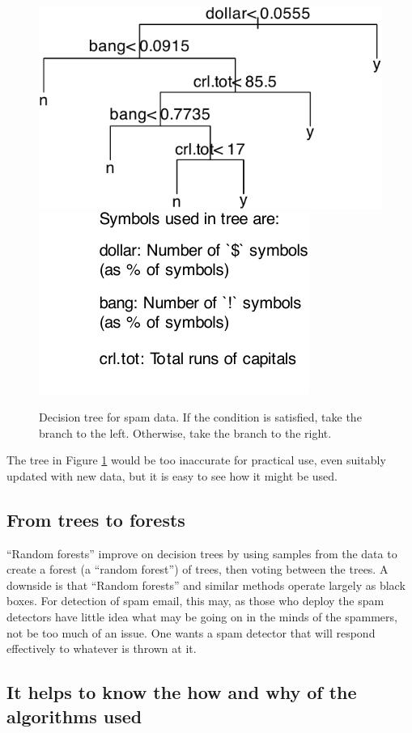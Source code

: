 \documentclass[
  10pt,
  b5paper]{book}
\begin{document}
\begin{figure}[H]

{\centering \includegraphics[width=0.48\linewidth]{08-observational_files/figure-latex/spam-1} \includegraphics[width=0.48\linewidth]{08-observational_files/figure-latex/spam-2} 

}

\caption{Decision tree for spam data. If the condition is satisfied, take
               the branch to the left.  Otherwise, take the branch to the right.}\label{fig:spam}
\end{figure}

The tree in Figure \ref{fig:spam} would be too inaccurate
for practical use, even suitably updated with new data,
but it is easy to see how it might be used.

\hypertarget{from-trees-to-forests}{%
\subsection*{From trees to forests}\label{from-trees-to-forests}}

``Random forests'' improve on decision trees by using samples from
the data to create a forest (a ``random forest'') of trees, then
voting between the trees. A downside is that ``Random forests''
and similar methods operate largely as black boxes. For
detection of spam email, this may, as those who deploy the
spam detectors have little idea what may be going on in the
minds of the spammers, not be too much of an issue. One
wants a spam detector that will respond effectively to
whatever is thrown at it.

\hypertarget{it-helps-to-know-the-how-and-why-of-the-algorithms-used}{%
\subsection*{It helps to know the how and why of the algorithms used}\label{it-helps-to-know-the-how-and-why-of-the-algorithms-used}}
\end{document}
